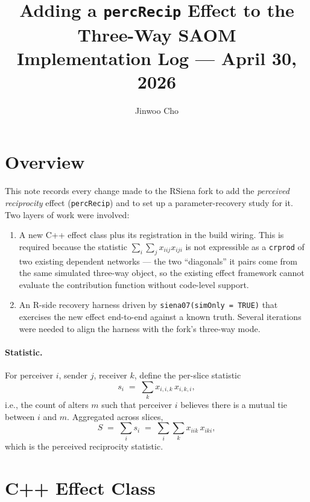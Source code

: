 \documentclass[11pt]{article}
\title{Adding a \texttt{percRecip} Effect to the Three-Way SAOM\\[4pt]
\large Implementation Log --- April 30, 2026}
\author{Jinwoo Cho}
\date{}
\begin{document}
\maketitle

\section{Overview}

This note records every change made to the RSiena fork to add the
\emph{perceived reciprocity} effect (\texttt{percRecip}) and to set up a
parameter-recovery study for it.  Two layers of work were involved:

\begin{enumerate}[leftmargin=*]
  \item A new C++ effect class plus its registration in the build
        wiring.  This is required because the statistic
        $\sum_i \sum_j x_{iij} x_{iji}$ is not expressible as a
        \texttt{crprod} of two existing dependent networks --- the two
        ``diagonals'' it pairs come from the same simulated three-way
        object, so the existing effect framework cannot evaluate the
        contribution function without code-level support.
  \item An R-side recovery harness driven by
        \texttt{siena07(simOnly = TRUE)} that exercises the new effect
        end-to-end against a known truth.  Several iterations were
        needed to align the harness with the fork's three-way mode.
\end{enumerate}

\paragraph{Statistic.}
For perceiver $i$, sender $j$, receiver $k$, define the per-slice
statistic
\[
s_i \;=\; \sum_{k} x_{i,i,k}\, x_{i,k,i},
\]
i.e., the count of alters $m$ such that perceiver $i$ believes there is a
mutual tie between $i$ and $m$.  Aggregated across slices,
\[
S \;=\; \sum_{i} s_i \;=\; \sum_{i}\sum_{k} x_{iik}\, x_{iki},
\]
which is the perceived reciprocity statistic.

\section{C++ Effect Class}
\end{document}

